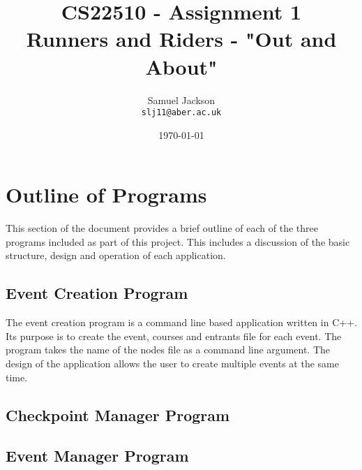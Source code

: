 \documentclass{article}
\begin{document}
\title{CS22510 - Assignment 1 \\ Runners and Riders - "Out and About"}
\author{Samuel Jackson \\ \texttt{slj11@aber.ac.uk}}
\date{\today}
\maketitle

\section{Outline of Programs}
This section of the document provides a brief outline of each of the three programs included as part of this project. This includes a discussion of the basic structure, design and operation of each application.

\subsection{Event Creation Program}
The event creation program is a command line based application written in C++. Its purpose is to create the event, courses and entrants file for each event. The program takes the name of the nodes file as a command line argument. The design of the application allows the user to create multiple events at the same time. 

\subsection{Checkpoint Manager Program}

\subsection{Event Manager Program}
\end{document}
